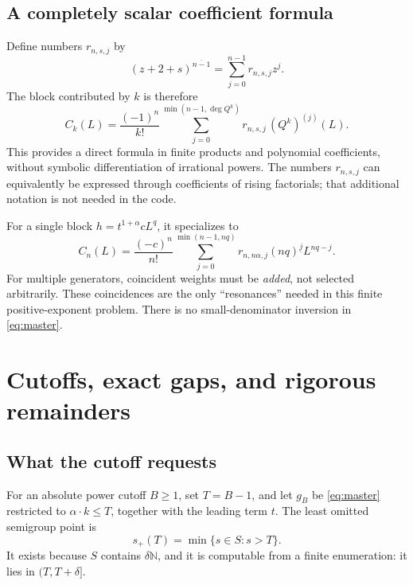 \documentclass[11pt,a4paper]{article}
\newcommand{\N}{\mathbb N}
\newcommand{\rising}[2]{\left(#1\right)^{\overline{#2}}}
\newcommand{\falling}[2]{\left(#1\right)^{\underline{#2}}}
\theoremstyle{definition}
\begin{document}
\subsection{A completely scalar coefficient formula}
Define numbers \(r_{n,s,j}\) by
\[
 \rising{z+2+s}{n-1}=\sum_{j=0}^{n-1}r_{n,s,j}z^j.
\]
The block contributed by \(k\) is therefore
\begin{equation}\label{eq:scalar}
 C_k(L)=\frac{(-1)^n}{k!}
 \sum_{j=0}^{\min(n-1,\deg Q^k)}r_{n,s,j}\,(Q^k)^{(j)}(L).
\end{equation}
This provides a direct formula in finite products and polynomial
coefficients, without symbolic differentiation of irrational powers. The
numbers \(r_{n,s,j}\) can equivalently be expressed through coefficients of
rising factorials; that additional notation is not needed in the code.

For a single block \(h=t^{1+\alpha}cL^q\), it specializes to
\[
 C_n(L)=\frac{(-c)^n}{n!}
 \sum_{j=0}^{\min(n-1,nq)}r_{n,n\alpha,j}
 \falling{nq}{j}L^{nq-j}.
\]
For multiple generators, coincident weights must be \emph{added}, not
selected arbitrarily. These coincidences are the only ``resonances'' needed
in this finite positive-exponent problem. There is no small-denominator
inversion in \eqref{eq:master}.

\section{Cutoffs, exact gaps, and rigorous remainders}
\subsection{What the cutoff requests}
For an absolute power cutoff \(B\ge1\), set \(T=B-1\), and let \(g_B\) be
\eqref{eq:master} restricted to \(\alpha\cdot k\le T\), together with the
leading term \(t\). The least omitted semigroup point is
\begin{equation}\label{eq:nextgap}
 s_+(T)=\min\{s\in S:s>T\}.
\end{equation}
It exists because \(S\) contains \(\delta\N\), and it is computable from a
finite enumeration: it lies in \((T,T+\delta]\).
\end{document}
